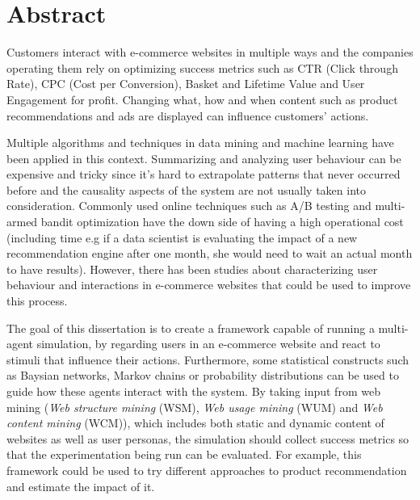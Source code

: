 \chapter*{Abstract}


Customers interact with e-commerce websites in multiple ways and the
companies operating them rely on optimizing success metrics such as
CTR (Click through Rate), CPC (Cost per Conversion), Basket and Lifetime
Value and User Engagement for profit. Changing what, how and when content
such as product recommendations and ads are displayed can influence
customers' actions.

Multiple algorithms and techniques in data mining and machine learning
have been applied in this context. Summarizing and analyzing user
behaviour can be expensive and tricky since it's hard to extrapolate
patterns that never occurred before and the causality aspects of the
system are not usually taken into consideration. Commonly used online
techniques such as A/B testing and multi-armed bandit optimization have
the down side of having a high operational cost (including time e.g if
a data scientist is evaluating the impact of a new recommendation engine
after one month, she would need to wait an actual month to have results).
However, there has been studies about characterizing user behaviour and
interactions in e-commerce websites that could be used to improve this
process.

The goal of this dissertation is to create a framework capable of running
a multi-agent simulation, by regarding users in an e-commerce website and
react to stimuli that influence their actions. Furthermore, some statistical
constructs such as Baysian networks, Markov chains or probability
distributions can be used to guide how these agents interact with the
system. By taking input from web mining (\emph{Web structure mining} (WSM),
\emph{Web usage mining} (WUM) and \emph{Web content mining} (WCM)), which
includes both static and dynamic content of websites as well as user
personas, the simulation should collect success metrics so that the
experimentation being run can be evaluated. For example, this framework
could be used to try different approaches to product recommendation and
estimate the impact of it.




